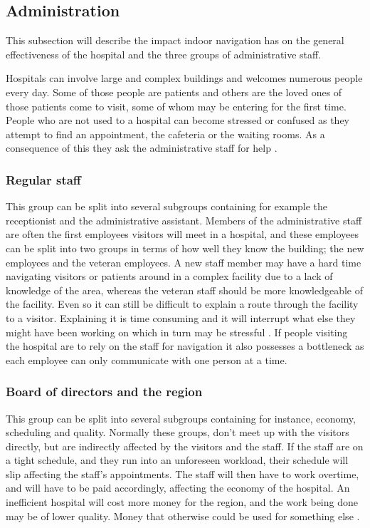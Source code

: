 \subsection{Administration}

This subsection will describe the impact indoor navigation has on the general effectiveness of the hospital and the three groups of administrative staff.

Hospitals can involve large and complex buildings \cite{wifi_navigation_ca} and welcomes numerous people every day. Some of those people are patients and others are the loved ones of those patients come to visit, some of whom may be entering for the first time. People who are not used to a hospital can become stressed or confused as they attempt to find an appointment, the cafeteria or the waiting rooms. As a consequence of this they ask the administrative staff for help \cite{Frivillige_guider}.

\subsubsection{Regular staff}
This group can be split into several subgroups containing for example the receptionist and the administrative assistant. Members of the administrative staff are often the first employees visitors will meet in a hospital, and these employees can be split into two groups in terms of how well they know the building; the new employees and the veteran employees. A new staff member may have a hard time navigating visitors or patients around in a complex facility due to a lack of knowledge of the area, whereas the veteran staff should be more knowledgeable of the facility. Even so it can still be difficult to explain a route through the facility to a visitor. Explaining it is time consuming and it will interrupt what else they might have been working on which in turn may be stressful \cite{arbejdsmiljo_ca}. If people visiting the hospital are to rely on the staff for navigation it also possesses a bottleneck as each employee can only communicate with one person at a time.

\subsubsection{Board of directors and the region}
This group can be split into several subgroups containing for instance, economy, scheduling and quality. Normally these groups, don't meet up with the visitors directly, but are indirectly affected by the visitors and the staff. If the staff are on a tight schedule, and they run into an unforeseen workload, their schedule will slip affecting the staff's appointments. The staff will then have to work overtime, and  will have to be paid accordingly, affecting the economy of the hospital. An inefficient hospital will cost more money for the region, and the work being done may be of lower quality. Money that otherwise could be used for something else \cite{timer_til_at_hjelpe_rundt}.

